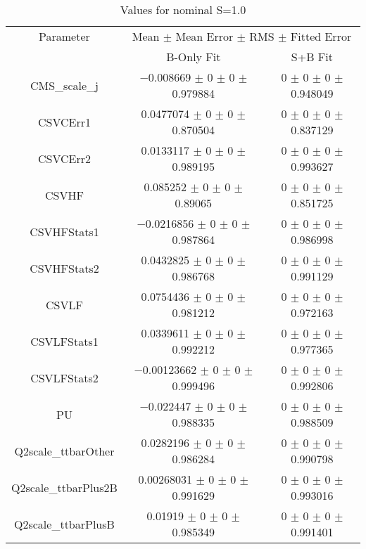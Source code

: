 \begin{table}
\centering
\caption{Values for nominal S=1.0}
\begin{tabular}{ccc}
\toprule
Parameter & \multicolumn{2}{c}{Mean $\pm$ Mean Error $\pm$ RMS $\pm$ Fitted Error}\\
 & B-Only Fit & S+B Fit\\
\midrule
CMS\_scale\_j & \num{-0.008669} $\pm$ \num{0} $\pm$ \num{0} $\pm$ \num{0.979884} & \num{0} $\pm$ \num{0} $\pm$ \num{0} $\pm$ \num{0.948049}\\
CSVCErr1 & \num{0.0477074} $\pm$ \num{0} $\pm$ \num{0} $\pm$ \num{0.870504} & \num{0} $\pm$ \num{0} $\pm$ \num{0} $\pm$ \num{0.837129}\\
CSVCErr2 & \num{0.0133117} $\pm$ \num{0} $\pm$ \num{0} $\pm$ \num{0.989195} & \num{0} $\pm$ \num{0} $\pm$ \num{0} $\pm$ \num{0.993627}\\
CSVHF & \num{0.085252} $\pm$ \num{0} $\pm$ \num{0} $\pm$ \num{0.89065} & \num{0} $\pm$ \num{0} $\pm$ \num{0} $\pm$ \num{0.851725}\\
CSVHFStats1 & \num{-0.0216856} $\pm$ \num{0} $\pm$ \num{0} $\pm$ \num{0.987864} & \num{0} $\pm$ \num{0} $\pm$ \num{0} $\pm$ \num{0.986998}\\
CSVHFStats2 & \num{0.0432825} $\pm$ \num{0} $\pm$ \num{0} $\pm$ \num{0.986768} & \num{0} $\pm$ \num{0} $\pm$ \num{0} $\pm$ \num{0.991129}\\
CSVLF & \num{0.0754436} $\pm$ \num{0} $\pm$ \num{0} $\pm$ \num{0.981212} & \num{0} $\pm$ \num{0} $\pm$ \num{0} $\pm$ \num{0.972163}\\
CSVLFStats1 & \num{0.0339611} $\pm$ \num{0} $\pm$ \num{0} $\pm$ \num{0.992212} & \num{0} $\pm$ \num{0} $\pm$ \num{0} $\pm$ \num{0.977365}\\
CSVLFStats2 & \num{-0.00123662} $\pm$ \num{0} $\pm$ \num{0} $\pm$ \num{0.999496} & \num{0} $\pm$ \num{0} $\pm$ \num{0} $\pm$ \num{0.992806}\\
PU & \num{-0.022447} $\pm$ \num{0} $\pm$ \num{0} $\pm$ \num{0.988335} & \num{0} $\pm$ \num{0} $\pm$ \num{0} $\pm$ \num{0.988509}\\
Q2scale\_ttbarOther & \num{0.0282196} $\pm$ \num{0} $\pm$ \num{0} $\pm$ \num{0.986284} & \num{0} $\pm$ \num{0} $\pm$ \num{0} $\pm$ \num{0.990798}\\
Q2scale\_ttbarPlus2B & \num{0.00268031} $\pm$ \num{0} $\pm$ \num{0} $\pm$ \num{0.991629} & \num{0} $\pm$ \num{0} $\pm$ \num{0} $\pm$ \num{0.993016}\\
Q2scale\_ttbarPlusB & \num{0.01919} $\pm$ \num{0} $\pm$ \num{0} $\pm$ \num{0.985349} & \num{0} $\pm$ \num{0} $\pm$ \num{0} $\pm$ \num{0.991401}\\

\end{tabular}
\end{table}
